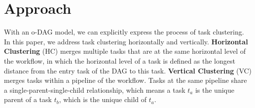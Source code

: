 



\section{Approach}





With an o-DAG model, we can explicitly express the process of task clustering. In this paper, we address task clustering horizontally and vertically. \textbf{Horizontal Clustering} (HC) merges multiple tasks that are at the same horizontal level of the workflow, in which the horizontal level of a task is defined as the longest distance from the entry task of the DAG to this task. \textbf{Vertical Clustering} (VC) merges tasks within a pipeline of the workflow. Tasks at the same pipeline share a single-parent-single-child relationship, which means a task $t_a$ is the unique parent of a task $t_b$, which is the unique child of $t_a$. 

